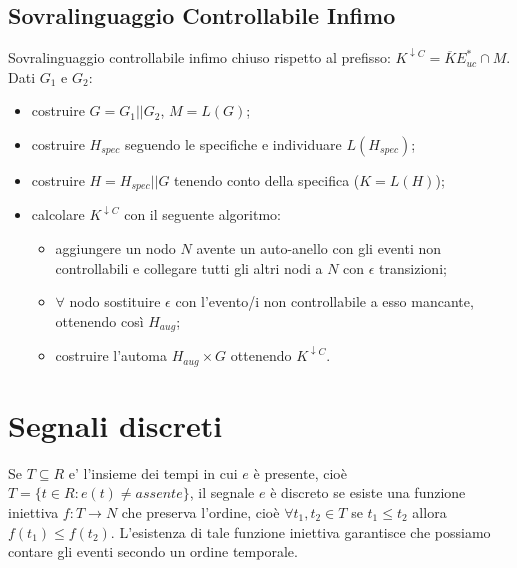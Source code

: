 \documentclass[a4paper, notitlepage, 10pt]{report}
\begin{document}
\section*{Sovralinguaggio Controllabile Infimo}
Sovralinguaggio controllabile infimo chiuso rispetto al prefisso: $K^{\downarrow C} = \overline{K} E^*_{uc} \cap M$.
\\
Dati $G_1$ e $G_2$:
\begin{itemize}
	\item costruire $G = G_1 || G_2$, $M = L(G)$;
	\item costruire $H_{spec}$ seguendo le specifiche e individuare $L(H_{spec})$;
	\item costruire $H = H_{spec} || G$ tenendo conto della specifica ($K = L(H)$);
	\item calcolare $K^{\downarrow C}$ con il seguente algoritmo:
	\begin{itemize}
		\item aggiungere un nodo $N$ avente un auto-anello con gli eventi non controllabili e collegare tutti gli altri nodi a $N$ con $\epsilon$ transizioni;
		\item $\forall$ nodo sostituire $\epsilon$ con l'evento/i non controllabile a esso mancante, ottenendo così $H_{aug}$;
		\item costruire l'automa $H_{aug} \times G$ ottenendo $K^{\downarrow C}$.
	\end{itemize}
\end{itemize}


\chapter*{Segnali discreti}
Se $T \subseteq R$ e’ l’insieme dei tempi in cui $e$ è presente, cioè $T = \{t \in R : e(t) \neq assente\}$, il segnale $e$ è discreto se esiste una funzione iniettiva $f : T \rightarrow N$ che preserva l’ordine, cioè $\forall t_1, t_2 \in T$ se $t_1 \leq t_2$ allora $f(t_1) \leq f(t_2)$. L’esistenza di tale funzione iniettiva garantisce che possiamo contare gli eventi secondo un ordine temporale.
\end{document}
